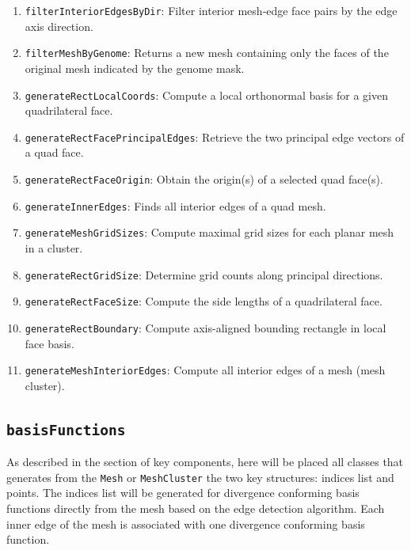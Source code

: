 \documentclass[9pt]{article}
\begin{document}
\begin{enumerate}[label=\Roman*.]
\begin{enumerate}[label=\roman*.]
            \item \texttt{filterInteriorEdgesByDir}: Filter interior mesh‐edge face pairs by the edge axis direction.
            \item \texttt{filterMeshByGenome}: Returns a new mesh containing only the faces of the original mesh indicated by the genome mask.
            \item \texttt{generateRectLocalCoords}: Compute a local orthonormal basis for a given quadrilateral face.
            \item \texttt{generateRectFacePrincipalEdges}: Retrieve the two principal edge vectors of a quad face.
            \item \texttt{generateRectFaceOrigin}: Obtain the origin(s) of a selected quad face(s).
            \item \texttt{generateInnerEdges}: Finds all interior edges of a quad mesh.
            \item \texttt{generateMeshGridSizes}: Compute maximal grid sizes for each planar mesh in a cluster.
            \item \texttt{generateRectGridSize}: Determine grid counts along principal directions.
            \item \texttt{generateRectFaceSize}: Compute the side lengths of a quadrilateral face.
            \item \texttt{generateRectBoundary}: Compute axis-aligned bounding rectangle in local face basis.
            \item \texttt{generateMeshInteriorEdges}: Compute all interior edges of a mesh (mesh cluster).
        \end{enumerate}
    \end{enumerate}

    \subsection{\texttt{basisFunctions}}

    As described in the section of key components, here will be placed all classes that generates from the \texttt{Mesh} or \texttt{MeshCluster} the two key structures: indices list and points. The indices list will be generated for divergence conforming basis functions directly from the mesh based on the edge detection algorithm. Each inner edge of the mesh is associated with one divergence conforming basis function.
\end{document}
